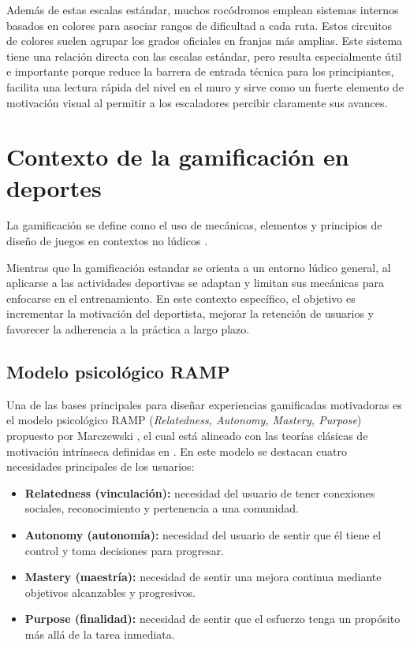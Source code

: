Además de estas escalas estándar, muchos rocódromos emplean sistemas internos basados en colores para asociar rangos de dificultad a cada 
ruta. Estos circuitos de colores suelen agrupar los grados oficiales en franjas más amplias. Este sistema tiene una relación directa con las 
escalas estándar, pero resulta especialmente útil e importante porque reduce la barrera de entrada técnica para los principiantes, 
facilita una lectura rápida del nivel en el muro y sirve como un fuerte elemento de motivación visual al permitir a los escaladores 
percibir claramente sus avances.


\section{Contexto de la gamificación en deportes}

La gamificación se define como el uso de mecánicas, elementos y principios de diseño de juegos en contextos no lúdicos 
\citep{deterding2011game} .

Mientras que la gamificación estandar se orienta a un entorno lúdico general, al aplicarse a las actividades deportivas se 
adaptan y limitan sus mecánicas para enfocarse en el entrenamiento. En este contexto específico, el objetivo es incrementar la motivación 
del deportista, mejorar la retención de usuarios y favorecer la adherencia a la práctica a largo plazo.

\subsection{Modelo psicológico RAMP}

Una de las bases principales para diseñar experiencias gamificadas motivadoras es el modelo psicológico RAMP 
(\textit{Relatedness, Autonomy, Mastery, Purpose}) propuesto por Marczewski \citep{marczewski2015even}, el cual está alineado con las 
teorías clásicas de motivación intrínseca definidas en \cite{ryan2000self}. En este modelo se destacan cuatro necesidades principales de los usuarios:

\begin{itemize}
	\item \textbf{Relatedness (vinculación):} necesidad del usuario de tener conexiones sociales, reconocimiento y pertenencia a una comunidad.
	\item \textbf{Autonomy (autonomía):} necesidad del usuario de sentir que él tiene el control y toma decisiones para progresar.
	\item \textbf{Mastery (maestría):} necesidad de sentir una mejora continua mediante objetivos alcanzables y progresivos.
	\item \textbf{Purpose (finalidad):} necesidad de sentir que el esfuerzo tenga un propósito más allá de la tarea inmediata.
\end{itemize}

